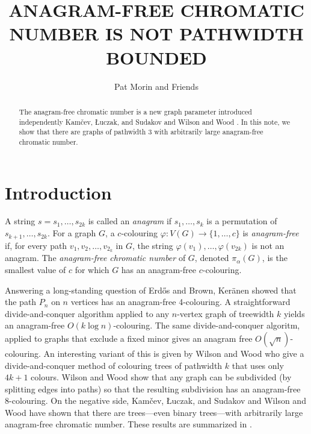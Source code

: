 \documentclass{patmorin}
\title{\MakeUppercase{Anagram-Free Chromatic Number is not Pathwidth Bounded}}
\author{Pat Morin and Friends}%
\begin{document}
\maketitle
%
\begin{abstract}
  The anagram-free chromatic number is a new graph parameter introduced
  independently Kamčev, Łuczak, and Sudakov \cite{kamcev.luczak.ea:anagram-free}
  and Wilson and Wood \cite{wilson.wood:anagram-free}.  In this note, we show
  that there are graphs of pathwidth 3 with arbitrarily large anagram-free
  chromatic number.
\end{abstract}
%
%


\section{Introduction}

A string $s=s_1,\ldots,s_{2k}$ is called an \emph{anagram} if $s_1,\ldots,s_k$ is a permutation of $s_{k+1},\ldots,s_{2k}$.
For a graph $G$, a $c$-colouring $\varphi:V(G)\to\{1,\ldots,c\}$ is
\emph{anagram-free} if, for every path $v_1,v_2,\ldots,v_{2_k}$ in
$G$, the string $\varphi(v_1),\ldots,\varphi(v_{2k})$ is not an anagram.  The
\emph{anagram-free chromatic number} of $G$, denoted $\pi_\alpha(G)$, is
the smallest value of $c$ for which $G$ has an anagram-free $c$-colouring.

Answering a long-standing question of Erd\H{o}s and Brown, Ker\"anen
showed that the path $P_n$ on $n$ vertices has an anagram-free
4-colouring.  A straightforward divide-and-conquer algorithm applied
to any $n$-vertex graph of treewidth $k$ yields an anagram-free
$O(k\log n)$-colouring.  The same divide-and-conquer algoritm,
applied to graphs that exclude a fixed minor gives an anagram
free $O(\sqrt{n})$-colouring.  An interesting variant of this is
given by Wilson and Wood \cite{wilson.wood:anagram-free} who give a
divide-and-conquer method of colouring trees of pathwidth $k$ that uses
only $4k+1$ colours.  Wilson and Wood \cite{wilson.wood:anagram-free2}
show that any graph can be subdivided (by splitting edges into paths)
so that the resulting subdivision has an anagram-free 8-colouring.
On the negative side, Kamčev, Łuczak,
and Sudakov \cite{kamcev.luczak.ea:anagram-free} and Wilson and Wood
\cite{wilson.wood:anagram-free} have shown that there are trees---even binary trees---with arbitrarily large anagram-free chromatic number.
These results are summarized in .
\end{document}
